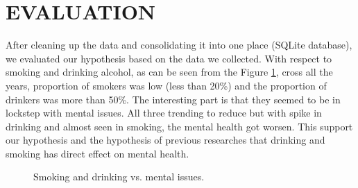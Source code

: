 \documentclass[letterpaper, 10 pt, conference]{ieeeconf}  %
\begin{document}


\setlength{\parskip}{.5em} %
\section{EVALUATION}
After cleaning up the data and consolidating it into one place (SQLite database), we evaluated 
our hypothesis based on the data we collected. With respect to smoking and drinking alcohol, 
as can be seen from the Figure \ref{fig:smoke-drink}, cross all the years, proportion of smokers 
was low (less than 20\%) and the proportion of drinkers was more than 50\%. 
The interesting part is that they seemed to be in lockstep with mental issues.
All three trending to reduce but with spike in drinking and almost seen in smoking, the mental health
got worsen. This support our hypothesis and the hypothesis of previous researches that drinking and smoking 
has direct effect on mental health.

\begin{figure}[!htb]
        \caption{\label{fig:smoke-drink} Smoking and drinking vs. mental issues.}
\end{figure}
\end{document}

